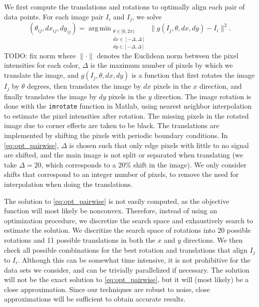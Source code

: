 \documentclass{pnastwo}
\DeclareMathOperator*{\argmin}{arg\,min}
\begin{document}
\begin{article}
\begin{materials}
We first compute the translations and rotations to optimally align each pair of data points. 
%
For each image pair $I_i$ and $I_j$, we solve
\begin{equation}\label{eq:opt_pairwise}
(\theta_{ij}, dx_{ij}, dy_{ij}) = \argmin_{
\begin{matrix}
\theta \in [0, 2\pi) \\ 
dx \in [-\Delta, \Delta]\\ 
dy \in [-\Delta, \Delta]
\end{matrix}
} \|g(I_j, \theta, dx, dy) - I_i \|^2.
\end{equation}
TODO: fix norm
where $\| \cdot \|$ denotes the Euclidean norm between the pixel intensities for each color, $\Delta$ is the maximum number of pixels by which we translate the image, and $g(I_j, \theta, dx, dy)$ is a function that first rotates the image $I_j$ by $\theta$ degrees, then translates the image by $dx$ pixels in the $x$ direction, and finally translates the image by $dy$ pixels in the $y$ direction. 
%
The image rotation is done with the \texttt{imrotate} function in Matlab, using nearest neighbor interpolation to estimate the pixel intensities after rotation.%
%
The missing pixels in the rotated image due to corner effects are taken to be black.
%
The translations are implemented by shifting the pixels with periodic boundary conditions.
%
In \eqref{eq:opt_pairwise}, $\Delta$ is chosen such that only edge pixels with little to no signal are shifted, and the main image is not split or separated when translating (we take $\Delta=20$, which corresponds to a 20\% shift in the image).
%
We only consider shifts that correspond to an integer number of pixels, to remove the need for interpolation when doing the translations.  

The solution to \eqref{eq:opt_pairwise} is not easily computed, as the objective function will most likely be nonconvex.
%
Therefore, instead of using an optimization procedure, we discretize the search space and exhaustively search to estimate the solution.
%
We discritize the search space of rotations into 20 possible rotations %
and 11 possible translations in both the $x$ and $y$ directions. %
%
We then check all possible combinations for the best rotation and translations that align $I_j$ to $I_i$. 
%
Although this can be somewhat time intensive, it is not prohibitive for the data sets we consider, and can be trivially parallelized if necessary.
%
The solution will not be the exact solution to \eqref{eq:opt_pairwise}, but it will (most likely) be a close approximation.
%
Since our techniques are robust to noise, close approximations will be sufficient to obtain accurate results.


\end{materials}
\end{article}
\end{document}
